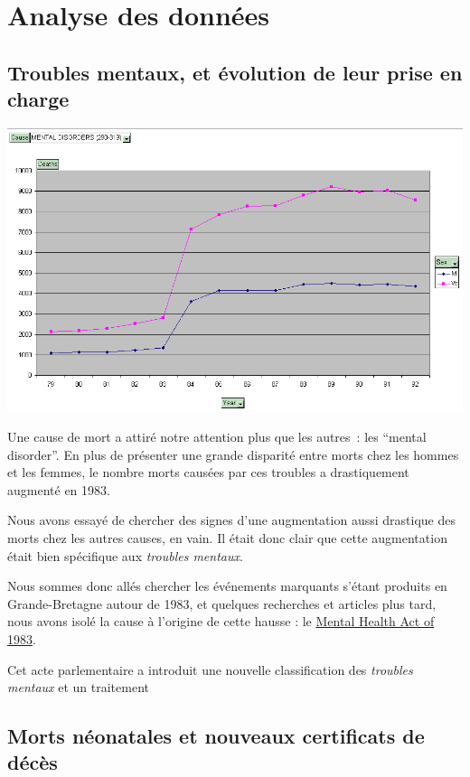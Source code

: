 \chapter{Analyse des données}

\section{Troubles mentaux, et évolution de leur prise en charge}

    \includegraphics[scale=0.5]{images/mental_disorder.png}

    Une cause de mort a attiré notre attention plus que les autres~: les ``mental disorder''. En plus de présenter une grande disparité
    entre morts chez les hommes et les femmes, le nombre morts causées par ces troubles a drastiquement augmenté en 1983.

    Nous avons essayé de chercher des signes d'une augmentation aussi drastique des morts chez les autres causes, en vain. Il était donc
    clair que cette augmentation était bien spécifique aux \textit{troubles mentaux}.

    Nous sommes donc allés chercher les événements marquants s'étant produits en Grande-Bretagne autour de 1983, et quelques recherches
    et articles plus tard, nous avons isolé la cause à l'origine de cette hausse : le \href{en.wikipedia.org/wiki/Mental_Health_Act_1983‎}{Mental Health Act of 1983}.

    Cet acte parlementaire a introduit une nouvelle classification des \textit{troubles mentaux} et un traitement

\section{Morts néonatales et nouveaux certificats de décès}

